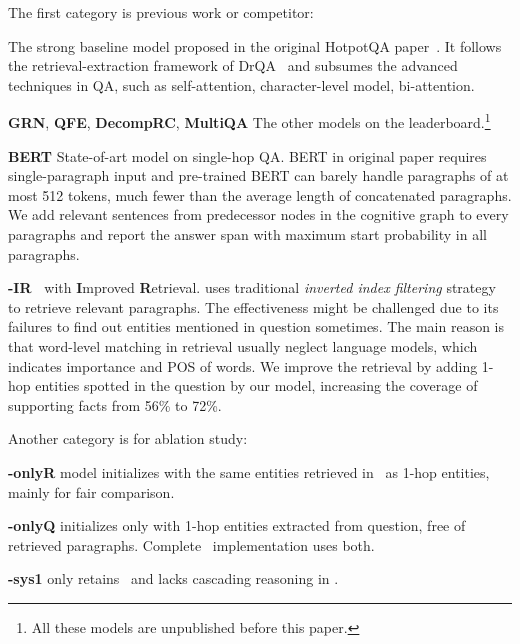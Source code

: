 The first category is previous work or competitor:
\begin{compactitem}
\setlength{\itemsep}{-12pt}
\item\textbf{\citet{yang2018hotpotqa}} The strong baseline model proposed in the original HotpotQA paper~\cite{yang2018hotpotqa}. It follows the retrieval-extraction framework of DrQA~ and subsumes the advanced techniques in QA, such as self-attention, character-level model, bi-attention.\\ 
\item\textbf{GRN}, \textbf{QFE}, \textbf{DecompRC}, \textbf{MultiQA}  The other models on the leaderboard.\footnote{All these models are unpublished before this paper.}\\ 
\item\textbf{BERT} State-of-art model on single-hop QA. BERT in original paper requires single-paragraph input and pre-trained BERT can barely handle paragraphs of at most 512 tokens, much fewer than the average length of concatenated paragraphs. We add relevant sentences from predecessor nodes in the cognitive graph to every paragraphs and report the answer span with maximum start probability in all paragraphs.\\
\item\textbf{\citet{yang2018hotpotqa}-IR\ } \citet{yang2018hotpotqa} with \textbf{I}mproved \textbf{R}etrieval. \citet{yang2018hotpotqa} uses traditional \textit{inverted index filtering} strategy to retrieve relevant paragraphs. The effectiveness might be challenged due to its failures to find out entities mentioned in question sometimes. The main reason is that word-level matching in retrieval usually neglect language models, which indicates importance and POS of words. We improve the retrieval by adding 1-hop entities spotted in the question by our model, increasing the coverage of supporting facts from 56\% to 72\%. 
\end{compactitem}
Another category is for ablation study:
\begin{compactitem}
\setlength{\itemsep}{-12pt}
\item\textbf{\name-onlyR} model initializes  with the same entities retrieved in~\citet{yang2018hotpotqa} as 1-hop entities, mainly for fair comparison.\\ \item\textbf{\name-onlyQ} initializes  only with 1-hop entities extracted from question, free of retrieved paragraphs. Complete \name~implementation uses both.\\
\item\textbf{\name-sys1} only retains \sysone~and lacks cascading reasoning in \systwo.
\end{compactitem}


